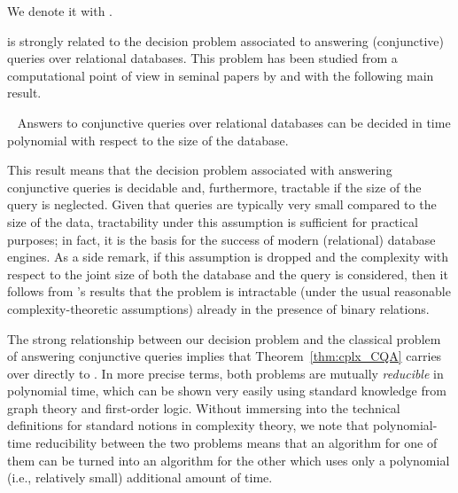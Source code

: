 We denote it with .

 is strongly related to the decision problem associated to
answering (conjunctive) queries over relational databases.
This problem has been studied from a computational point of view in seminal papers
by \textcite{Vardi1982} and \textcite{Chandra1977} with the following main result.
%
\begin{theorem}
  \label{thm:cplx_CQA}
  \textup{\autocite{Vardi1982}}~
  Answers to conjunctive queries over relational databases
  can be decided in time polynomial with respect to the size of the database.
\end{theorem}
%
This result means that the decision problem associated with answering conjunctive queries is decidable
and, furthermore, tractable if the size of the query is neglected.
Given that queries are typically very small compared to the size of the data,
tractability under this assumption is sufficient for practical purposes;
in fact, it is the basis for the success of modern (relational) database engines.
As a side remark, if this assumption is dropped and the complexity with respect
to the joint size of both the database and the query is considered,
then it follows from \citeauthor{Chandra1977}'s \autocite*{Chandra1977}
results that the problem 
is intractable (under the usual reasonable complexity-theoretic assumptions)
already in the presence of binary relations.

The strong relationship between our decision problem 
and the classical problem of answering conjunctive queries
implies that Theorem~\ref{thm:cplx_CQA} carries over directly to .
In more precise terms, both problems are mutually \emph{reducible} in polynomial time,
which can be shown very easily using standard knowledge from graph theory and first-order logic.
Without immersing into the technical definitions for standard notions in complexity theory,
we note that polynomial-time reducibility between the two problems
means that an algorithm for one of them
can be turned into an algorithm for the other which uses only a polynomial
(i.e., relatively small) additional amount of time.

